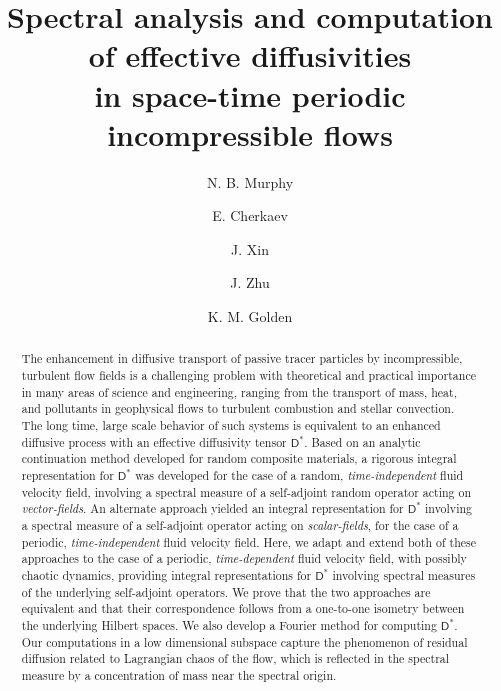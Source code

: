 \documentclass[leqno,onefignum,onetabnum]{siamltex1213}
\title{Spectral analysis and computation 
  of effective diffusivities \\in 
  space-time periodic incompressible flows  
      }
\author{
N. B. Murphy\footnotemark[1]
\and E. Cherkaev\footnotemark[2]
\and J. Xin\footnotemark[1]
\and J. Zhu\footnotemark[2]
\and K. M. Golden\footnotemark[2]%
}
\newcommand{\Dm}{\mathsf{D}}
\begin{document}
\maketitle
{}%

\renewcommand{\thefootnote}{\fnsymbol{footnote}}


\renewcommand{\thefootnote}{\arabic{footnote}}

 
\begin{abstract}
The enhancement in diffusive transport of passive tracer particles by
incompressible, turbulent flow fields is a challenging problem with
theoretical and practical importance in many areas of science and
engineering, ranging from the transport of mass, heat, and pollutants
in geophysical flows to turbulent combustion and stellar
convection. The long time, large scale behavior of such systems is
equivalent to an enhanced diffusive process with an effective
diffusivity tensor $\Dm^*$. Based on an analytic continuation method
developed for random composite materials, a rigorous integral
representation for $\Dm^*$ was developed for the case of a random,
\emph{time-independent} fluid velocity field, involving a spectral
measure of a self-adjoint random operator acting on
\emph{vector-fields}. An alternate approach yielded an integral
representation for $\Dm^*$ involving a spectral measure of a
self-adjoint operator acting on \emph{scalar-fields}, for the case of
a periodic, \emph{time-independent} fluid velocity field. Here, we
adapt and extend both of these approaches to the case of a periodic,
\emph{time-dependent} fluid velocity field, with possibly chaotic
dynamics, providing integral representations for $\Dm^*$ involving
spectral measures of the underlying self-adjoint operators. We prove
that the two approaches are equivalent and that their correspondence
follows from a one-to-one isometry between the underlying Hilbert
spaces. We also develop a 
Fourier method for computing $\Dm^*$. Our computations in a low
dimensional subspace capture the phenomenon of residual diffusion
related to Lagrangian chaos of the flow, which is reflected in
the spectral measure by a concentration of mass near the spectral origin.  
\end{abstract}
\end{document}
